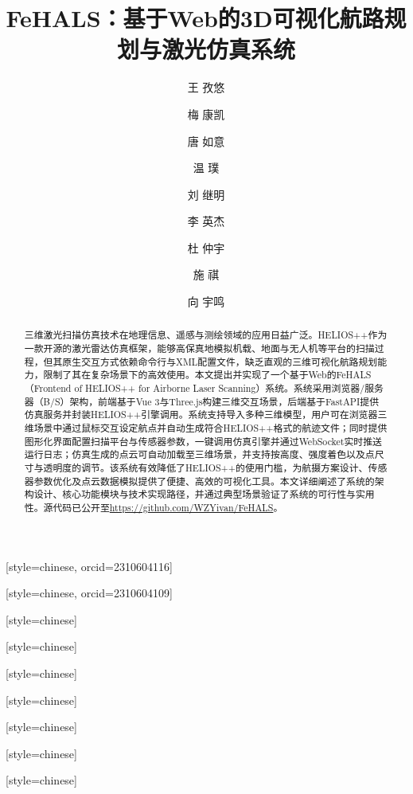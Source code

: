 \documentclass[a4paper,fleqn]{cas-sc}
\begin{document}
\let\WriteBookmarks\relax
\def\floatpagepagefraction{1}
\def\textpagefraction{.001}

\shorttitle{}
\title [mode = title]{FeHALS：基于Web的3D可视化航路规划与激光仿真系统}




\author[1]{王 孜悠}[style=chinese, orcid=2310604116]

\author[1]{梅 康凯}[style=chinese, orcid=2310604109]

\author[1]{唐 如意}[style=chinese]

\author[1]{温 璞}[style=chinese]

\author[1]{刘 继明}[style=chinese]

\author[1]{李 英杰}[style=chinese]

\author[1]{杜 仲宇}[style=chinese]

\author[1]{施 祺}[style=chinese]

\author[1]{向 宇鸣}[style=chinese]


\begin{abstract}
  三维激光扫描仿真技术在地理信息、遥感与测绘领域的应用日益广泛。HELIOS++作为一款开源的激光雷达仿真框架，能够高保真地模拟机载、地面与无人机等平台的扫描过程，但其原生交互方式依赖命令行与XML配置文件，缺乏直观的三维可视化航路规划能力，限制了其在复杂场景下的高效使用。本文提出并实现了一个基于Web的FeHALS（Frontend of HELIOS++ for Airborne Laser Scanning）系统。系统采用浏览器/服务器（B/S）架构，前端基于Vue 3与Three.js构建三维交互场景，后端基于FastAPI提供仿真服务并封装HELIOS++引擎调用。系统支持导入多种三维模型，用户可在浏览器三维场景中通过鼠标交互设定航点并自动生成符合HELIOS++格式的航迹文件；同时提供图形化界面配置扫描平台与传感器参数，一键调用仿真引擎并通过WebSocket实时推送运行日志；仿真生成的点云可自动加载至三维场景，并支持按高度、强度着色以及点尺寸与透明度的调节。该系统有效降低了HELIOS++的使用门槛，为航摄方案设计、传感器参数优化及点云数据模拟提供了便捷、高效的可视化工具。本文详细阐述了系统的架构设计、核心功能模块与技术实现路径，并通过典型场景验证了系统的可行性与实用性。源代码已公开至\url{https://github.com/WZYivan/FeHALS}。
\end{abstract}
\end{document}
